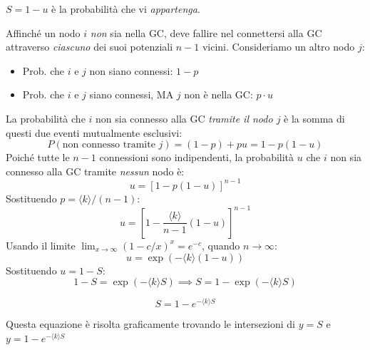 \noindent $S = 1 - u$ è la probabilità che vi \textit{appartenga}.

\noindent Affinché un nodo $i$ \textit{non} sia nella GC, deve fallire nel connettersi alla GC attraverso \textit{ciascuno} dei suoi potenziali $n-1$ vicini.
Consideriamo un altro nodo $j$:
\begin{itemize}
\item Prob. che $i$ e $j$ non siano connessi: $1-p$
\item Prob. che $i$ e $j$ siano connessi, MA $j$ non è nella GC: $p \cdot u$
\end{itemize}
La probabilità che $i$ non sia connesso alla GC \textit{tramite il nodo $j$} è la somma di questi due eventi mutualmente esclusivi:
$$ P(\text{non connesso tramite } j) = (1-p) + pu = 1 - p(1-u) $$
Poiché tutte le $n-1$ connessioni sono indipendenti, la probabilità $u$ che $i$ non sia connesso alla GC tramite \textit{nessun} nodo è:
$$ u = [1 - p(1-u)]^{n-1} $$
Sostituendo $p = \langle k \rangle / (n-1)$:
$$ u = \left[ 1 - \frac{\langle k \rangle}{n-1} (1-u) \right]^{n-1} $$
Usando il limite $\lim_{x\to\infty} (1 - c/x)^x = e^{-c}$, quando $n \to \infty$:
$$ u = \exp(-\langle k \rangle (1-u)) $$
Sostituendo $u = 1-S$:
$$ 1-S = \exp(-\langle k \rangle S) \implies S = 1 - \exp(-\langle k \rangle S) $$


\begin{tcolorbox} [colback=yellow!25, colframe=yellow!75!orange, coltitle=black, title=\textbf{Equazione di Autoconsistenza della Componente Gigante}]
\begin{equation} 
\label{eq:gc}
S = 1 - e^{-\langle k \rangle S}
\end{equation}
\end{tcolorbox}

\noindent Questa equazione è risolta graficamente trovando le intersezioni di $y=S$ e $y=1-e^{-\langle k \rangle S}$


